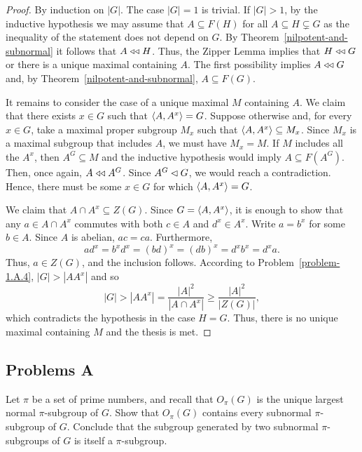 \begin{proof}
    By induction on $|G|$. The case $|G|=1$ is trivial. If $|G|>1$, by the inductive hypothesis we may assume that $A\subseteq F(H)$ for all $A\subseteq H\varsubsetneq G$ as the inequality of the statement does not depend on $G$. By Theorem~\ref{nilpotent-and-subnormal} it follows that $A\mathrel{\triangleleft\triangleleft} H$. Thus, the Zipper Lemma implies that $H\mathrel{\triangleleft\triangleleft} G$ or there is a unique maximal containing $A$. The first possibility implies $A\mathrel{\triangleleft\triangleleft} G$ and, by Theorem~\ref{nilpotent-and-subnormal}, $A\subseteq F(G)$.

    It remains to consider the case of a unique maximal $M$ containing $A$. We claim that there exists $x\in G$ such that $\langle A,A^x\rangle=G$. Suppose otherwise and, for every $x\in G$, take a maximal proper subgroup $M_x$ such that $\langle A,A^x\rangle\subseteq M_x$. Since $M_x$ is a maximal subgroup that includes $A$, we must have $M_x=M$. If $M$ includes all the $A^x$, then $A^G\subseteq M$ and the inductive hypothesis would imply $A\subseteq F(A^G)$. Then, once again, $A\mathrel{\triangleleft\triangleleft} A^G$. Since $A^G\lhd G$, we would reach a contradiction. Hence, there must be some $x\in G$ for which $\langle A,A^x\rangle=G$.

    We claim that $A\cap A^x\subseteq Z(G)$. Since $G=\langle A,A^x\rangle$, it is enough to show that any $a \in A\cap A^x$ commutes with both $c \in A$ and $d^x \in A^x$. Write $a=b^x$ for some $b \in A$. Since $A$ is abelian, $ac=ca$. Furthermore,
    $$
     ad^x = b^xd^x = (bd)^x = (db)^x = d^xb^x = d^xa.
    $$
    Thus, $a \in Z(G)$, and the inclusion follows. According to Problem~\ref{problem-1.A.4}, $|G|>|AA^x|$ and so
    $$
        |G| > |AA^x| = \frac{|A|^2}{|A\cap A^x|}\ge \frac{|A|^2}{|Z(G)|},
    $$
    which contradicts the hypothesis in the case $H=G$. Thus, there is no unique maximal containing $M$ and the thesis is met.
\end{proof}

\subsection{Problems A}

\begin{probl}
    Let $\pi$ be a set of prime numbers, and recall that\/ $O_\pi(G)$ is the unique largest normal $\pi$-subgroup of\/ $G$. Show that\/ $O_\pi(G)$ contains every subnormal $\pi$-subgroup of\/ $G$. Conclude that the subgroup generated by two subnormal $\pi$-subgroups of\/ $G$ is itself a $\pi$-subgroup.
\end{probl}


